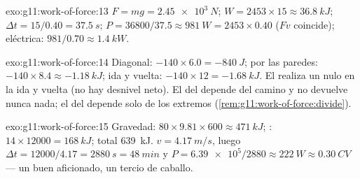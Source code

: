 \begin{solution}{exo:g11:work-of-force:13}
$F = mg = \qty{2.45e3}{N}$;
$W = 2453 \times 15 \approx \qty{36.8}{kJ}$;
$\Delta t = 15/0.40 = \qty{37.5}{s}$;
$P = 36800/37.5 \approx \qty{981}{W} = 2453 \times 0.40$ ($Fv$
coincide); eléctrica: $981/0.70 \approx \qty{1.4}{kW}$.
\end{solution}

\begin{solution}{exo:g11:work-of-force:14}
Diagonal: $-140 \times 6.0 = -\qty{840}{J}$; por las paredes:
$-140 \times 8.4 \approx -\qty{1.18}{kJ}$; ida y vuelta:
$-140 \times 12 = -\qty{1.68}{kJ}$. El  realiza un  nulo en
la ida y vuelta (no hay desnivel neto). El  del 
depende del camino y no devuelve nunca nada; el del  depende solo de
los extremos (\cref{rem:g11:work-of-force:divide}).
\end{solution}

\begin{solution}{exo:g11:work-of-force:15}
Gravedad: $80 \times 9.81 \times 600 \approx \qty{471}{kJ}$;
: $14 \times 12000 = \qty{168}{kJ}$; total \qty{639}{kJ}.
$v = \qty{4.17}{m/s}$, luego
$\Delta t = 12000/4.17 = \qty{2880}{s} = \qty{48}{min}$ y
$P = \num{6.39e5}/2880 \approx \qty{222}{W} \approx \qty{0.30}{CV}$ ---
un buen aficionado, un tercio de caballo.
\end{solution}

